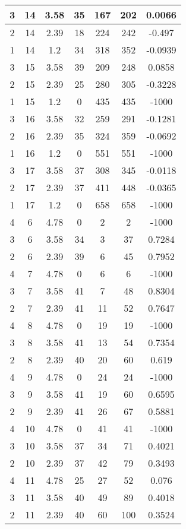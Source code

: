 \documentclass[letterpaper, 12pt]{article}
\begin{document}
\begin{longtable}{|c|c|c|c|c|c|c|}
\hline
3 & 14 & 3.58 & 35 & 167 & 202 & 0.0066 \\
\hline
2 & 14 & 2.39 & 18 & 224 & 242 & -0.497 \\
\hline
1 & 14 & 1.2 & 34 & 318 & 352 & -0.0939 \\
\hline
3 & 15 & 3.58 & 39 & 209 & 248 & 0.0858 \\
\hline
2 & 15 & 2.39 & 25 & 280 & 305 & -0.3228 \\
\hline
1 & 15 & 1.2 & 0 & 435 & 435 & -1000 \\
\hline
3 & 16 & 3.58 & 32 & 259 & 291 & -0.1281 \\
\hline
2 & 16 & 2.39 & 35 & 324 & 359 & -0.0692 \\
\hline
1 & 16 & 1.2 & 0 & 551 & 551 & -1000 \\
\hline
3 & 17 & 3.58 & 37 & 308 & 345 & -0.0118 \\
\hline
2 & 17 & 2.39 & 37 & 411 & 448 & -0.0365 \\
\hline
1 & 17 & 1.2 & 0 & 658 & 658 & -1000 \\
\hline
4 & 6 & 4.78 & 0 & 2 & 2 & -1000 \\
\hline
3 & 6 & 3.58 & 34 & 3 & 37 & 0.7284 \\
\hline
2 & 6 & 2.39 & 39 & 6 & 45 & 0.7952 \\
\hline
4 & 7 & 4.78 & 0 & 6 & 6 & -1000 \\
\hline
3 & 7 & 3.58 & 41 & 7 & 48 & 0.8304 \\
\hline
2 & 7 & 2.39 & 41 & 11 & 52 & 0.7647 \\
\hline
4 & 8 & 4.78 & 0 & 19 & 19 & -1000 \\
\hline
3 & 8 & 3.58 & 41 & 13 & 54 & 0.7354 \\
\hline
2 & 8 & 2.39 & 40 & 20 & 60 & 0.619 \\
\hline
4 & 9 & 4.78 & 0 & 24 & 24 & -1000 \\
\hline
3 & 9 & 3.58 & 41 & 19 & 60 & 0.6595 \\
\hline
2 & 9 & 2.39 & 41 & 26 & 67 & 0.5881 \\
\hline
4 & 10 & 4.78 & 0 & 41 & 41 & -1000 \\
\hline
3 & 10 & 3.58 & 37 & 34 & 71 & 0.4021 \\
\hline
2 & 10 & 2.39 & 37 & 42 & 79 & 0.3493 \\
\hline
4 & 11 & 4.78 & 25 & 27 & 52 & 0.076 \\
\hline
3 & 11 & 3.58 & 40 & 49 & 89 & 0.4018 \\
\hline
2 & 11 & 2.39 & 40 & 60 & 100 & 0.3524 \\

\end{longtable}
\end{document}
